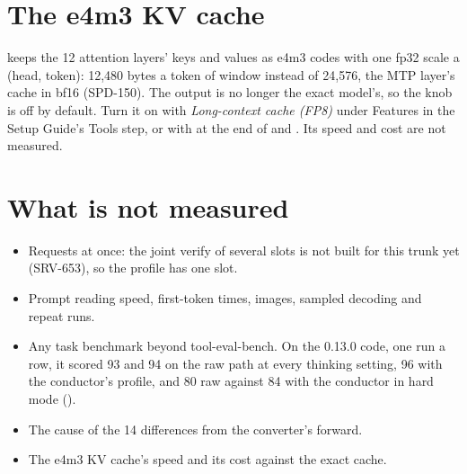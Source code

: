 \section{The e4m3 KV cache}

 keeps the 12 attention layers' keys and values as e4m3 codes with one fp32 scale a (head, token): 12,480 bytes a token of window instead of 24,576, the MTP layer's cache in bf16 (SPD-150). The output is no longer the exact model's, so the knob is off by default. Turn it on with \emph{Long-context cache (FP8)} under Features in the Setup Guide's Tools step, or with  at the end of  and . Its speed and cost are not measured.

\section{What is not measured}

\begin{itemize}
\item Requests at once: the joint verify of several slots is not built for this trunk yet (SRV-653), so the profile has one slot.
\item Prompt reading speed, first-token times, images, sampled decoding and repeat runs.
\item Any task benchmark beyond tool-eval-bench. On the 0.13.0 code, one run a row, it scored 93 and 94 on the raw path at every thinking setting, 96 with the conductor's  profile, and 80 raw against 84 with the conductor in hard mode ().
\item The cause of the 14 differences from the converter's forward.
\item The e4m3 KV cache's speed and its cost against the exact cache.
\end{itemize}
